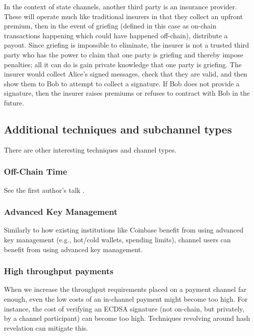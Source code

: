 \documentclass[prb,floatfix,reprint,nofootinbib,amsmath,amssymb,epsfig,pre,floats,letterpaper,groupedaffiliation,tightenlines,allcolors=blue,11pt]{revtex4}
\theoremstyle{definition}
\theoremstyle{definition}
\theoremstyle{definition}
\begin{document}
In the context of state channels, another third party is an insurance provider. These will operate much like traditional insurers in that they collect an upfront premium, then in the event of griefing (defined in this case as on-chain transactions happening which could have happened off-chain), distribute a payout. Since griefing is impossible to eliminate, the insurer is not a trusted third party who has the power to claim that one party is griefing and thereby impose penalties; all it can do is gain private knowledge that one party is griefing. The insurer would collect Alice's signed messages, check that they are valid, and then show them to Bob to attempt to collect a signature. If Bob does not provide a signature, then the insurer raises premiums or refuses to contract with Bob in the future.

\subsection{Additional techniques and subchannel types}

There are other interesting techniques and channel types.

\subsubsection{Off-Chain Time}

See the first author's talk \cite{devcon1:uht}.

\subsubsection{Advanced Key Management}

Similarly to how existing institutions like Coinbase benefit from using advanced key management (e.g., hot/cold wallets, spending limits), channel users can benefit from using advanced key management.

\subsubsection{High throughput payments}

When we increase the throughput requirements placed on a payment channel far enough, even the low costs of an in-channel payment might become too high. For instance, the cost of verifying an ECDSA signature (not on-chain, but privately, by a channel participant) can become too high. Techniques revolving around hash revelation can mitigate this.
\end{document}

